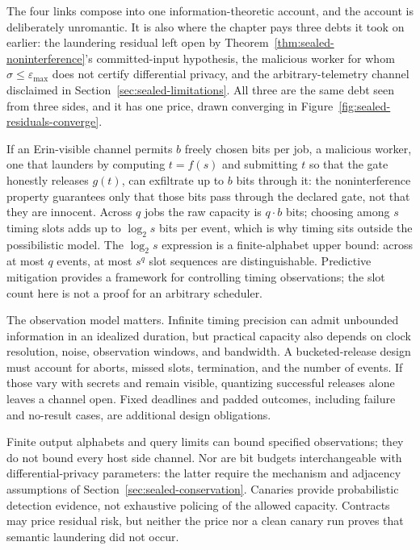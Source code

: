 \documentclass[11pt,a4paper]{article}
\theoremstyle{definition}
\begin{document}
The four links compose into one information-theoretic account, and the account
is deliberately unromantic. It is also where the chapter pays three debts it
took on earlier: the laundering residual left open by
Theorem~\ref{thm:sealed-noninterference}'s committed-input hypothesis, the
malicious worker for whom $\sigma\le\varepsilon_{\max}$ does not certify differential privacy,
and the arbitrary-telemetry channel disclaimed in
Section~\ref{sec:sealed-limitations}. All three are the same debt seen from
three sides, and it has one price, drawn converging in
Figure~\ref{fig:sealed-residuals-converge}.


\FloatBarrier

If an Erin-visible channel permits $b$
freely chosen bits per job, a malicious worker, one that launders by computing
$t=f(s)$ and submitting $t$ so that the gate honestly releases $g(t)$, can
exfiltrate up to $b$ bits through it: the noninterference property guarantees
only that those bits pass through the declared gate, not that they are
innocent. Across $q$ jobs the raw capacity is $q\cdot b$ bits; choosing among
$s$ timing slots adds up to $\log_2 s$ bits per event, which is why timing sits
outside the possibilistic model. The $\log_2 s$ expression is a finite-alphabet
upper bound: across at most $q$ events, at most $s^q$ slot sequences are
distinguishable. Predictive mitigation  provides a framework for
controlling timing observations; the slot count here is not a proof for an
arbitrary scheduler.

The observation model matters. Infinite timing precision can admit unbounded
information in an idealized duration, but practical capacity also depends on
clock resolution, noise, observation windows, and bandwidth. A bucketed-release
design must account for aborts, missed slots, termination, and the number of
events. If those vary with secrets and remain visible, quantizing successful
releases alone leaves a channel open. Fixed deadlines and padded outcomes,
including failure and no-result cases, are additional design obligations.

Finite output alphabets and query limits can bound specified observations;
they do not bound every host side channel. Nor are bit budgets interchangeable
with differential-privacy parameters: the latter require the mechanism and
adjacency assumptions of Section~\ref{sec:sealed-conservation}. Canaries provide
probabilistic detection evidence, not exhaustive policing of the allowed
capacity. Contracts may price residual risk, but neither the price nor a clean
canary run proves that semantic laundering did not occur.
\end{document}
